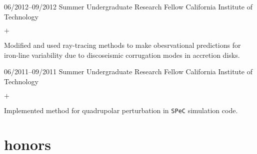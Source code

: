 \documentclass[]{luger-cv} %
\begin{document}
\begin{entrylist}
\ifdefined \onepage \else
\entry
{06/2012--09/2012}
{Summer Undergraduate Research Fellow}
{California Institute of Technology}
{%
\vspace{-1em}
\begin{list}{$+$}{\cvlist}
\item Modified and used ray-tracing methods to make obesrvational predictions for iron-line variability due to discoseismic corrugation modes in accretion disks.
\end{list}
}


\ifdefined \onepage \else
\entry
{06/2011--09/2011}
{Summer Undergraduate Research Fellow}
{California Institute of Technology}
{%
\vspace{-1em}
\begin{list}{$+$}{\cvlist}
\item Implemented method for quadrupolar perturbation in \texttt{SPeC} simulation code.
\end{list}
}
\fi


\end{entrylist}




\section{honors}
\end{document}
